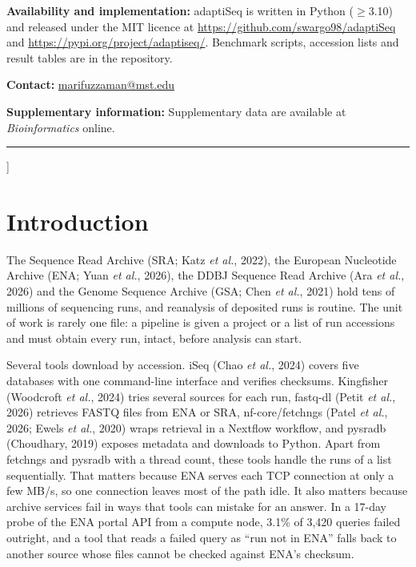 \documentclass[9pt,twocolumn,a4paper]{extarticle}
\begin{document}
\begin{@twocolumnfalse}
{\textbf{Availability and implementation:} adaptiSeq is written in Python ($\ge$3.10) and released under the MIT licence at \url{https://github.com/swargo98/adaptiSeq} and \url{https://pypi.org/project/adaptiseq/}. Benchmark scripts, accession lists and result tables are in the repository.\par\vspace{3pt}
\textbf{Contact:} \href{mailto:marifuzzaman@mst.edu}{marifuzzaman@mst.edu}\par\vspace{3pt}
\textbf{Supplementary information:} Supplementary data are available at \textit{Bioinformatics} online.}
\vspace{3pt}\hrule\vspace{8pt}
\end{@twocolumnfalse}
]

\section{Introduction}
The Sequence Read Archive (SRA; Katz {\it et al.}, 2022), the European Nucleotide Archive (ENA; Yuan {\it et al.}, 2026), the DDBJ Sequence Read Archive (Ara {\it et al.}, 2026) and the Genome Sequence Archive (GSA; Chen {\it et al.}, 2021) hold tens of millions of sequencing runs, and reanalysis of deposited runs is routine. The unit of work is rarely one file: a pipeline is given a project or a list of run accessions and must obtain every run, intact, before analysis can start.

Several tools download by accession. iSeq (Chao {\it et al.}, 2024) covers five databases with one command-line interface and verifies checksums. Kingfisher (Woodcroft {\it et al.}, 2024) tries several sources for each run, fastq-dl (Petit {\it et al.}, 2026) retrieves FASTQ files from ENA or SRA, nf-core/fetchngs (Patel {\it et al.}, 2026; Ewels {\it et al.}, 2020) wraps retrieval in a Nextflow workflow, and pysradb (Choudhary, 2019) exposes metadata and downloads to Python. Apart from fetchngs and pysradb with a thread count, these tools handle the runs of a list sequentially. That matters because ENA serves each TCP connection at only a few MB/s, so one connection leaves most of the path idle. It also matters because archive services fail in ways that tools can mistake for an answer. In a 17-day probe of the ENA portal API from a compute node, 3.1\% of 3,420 queries failed outright, and a tool that reads a failed query as ``run not in ENA'' falls back to another source whose files cannot be checked against ENA's checksum.
\end{document}
